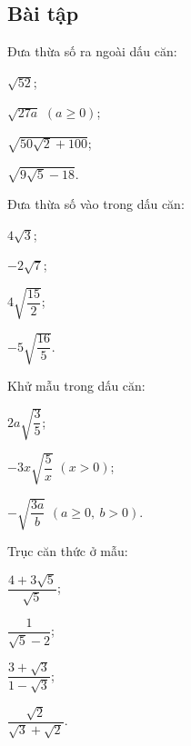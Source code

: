 \begin{exercises}
    \subsection{Bài tập}

    \begin{questions}[resume=SGK]
        \item Đưa thừa số ra ngoài dấu căn:
        \begin{questions}
            \item $\sqrt{52}$;
            \item $\sqrt{27a}$ $(a\ge0)$;
            \item $\sqrt{50\sqrt2+100}$;
            \item $\sqrt{9\sqrt5-18}$.
        \end{questions}

        \answerline
        \answerline

        \item Đưa thừa số vào trong dấu căn:
        \begin{questions}
            \item $4\sqrt3$;
            \item $-2\sqrt7$;
            \item $4\sqrt{\dfrac{15}{2}}$;
            \item $-5\sqrt{\dfrac{16}{5}}$.
        \end{questions}

        \answerline
        \answerline

        \item Khử mẫu trong dấu căn:
        \begin{questions}
            \item $2a\sqrt{\dfrac35}$;
            \item $-3x\sqrt{\dfrac5x}$ $(x>0)$;
            \item $-\sqrt{\dfrac{3a}{b}}$ $(a\ge0,\ b>0)$.
        \end{questions}

        \answerline
        \answerline

        \item Trục căn thức ở mẫu:
        \begin{questions}
            \item $\dfrac{4+3\sqrt5}{\sqrt5}$;
            \item $\dfrac1{\sqrt5-2}$;
            \item $\dfrac{3+\sqrt3}{1-\sqrt3}$;
            \item $\dfrac{\sqrt2}{\sqrt3+\sqrt2}$.
        \end{questions}


\end{questions}
\end{exercises}
